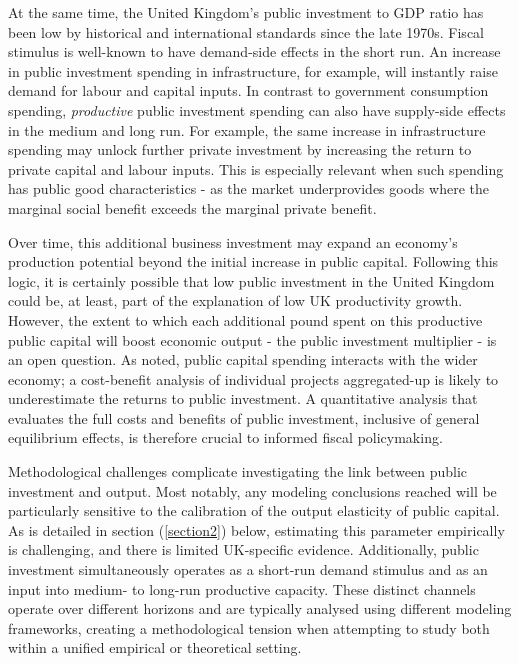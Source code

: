 \documentclass[titlepage, 11pt, a4paper]{article}
\renewcommand{\&}{and}
\begin{document}
At the same time, the United Kingdom's public investment to GDP ratio has been low by historical and international standards since the late 1970s. Fiscal stimulus is well-known to have demand-side effects in the short run. An increase in public investment spending in infrastructure, for example, will instantly raise demand for labour and capital inputs. 
In contrast to government consumption spending, \textit{productive} public investment spending can also have supply-side effects in the medium and long run. For example, the same increase in infrastructure spending may unlock further private investment by increasing the return to private capital and labour inputs. This is especially relevant when such spending has public good characteristics - as the market underprovides goods where the marginal social benefit exceeds the marginal private benefit.

Over time, this additional business investment may expand an economy's production potential beyond the initial increase in public capital. 
Following this logic, it is certainly possible that low public investment in the United Kingdom could be, at least, part of the explanation of low UK productivity growth.
However, the extent to which each additional pound spent on this productive public capital will boost economic output - the public investment multiplier - is an open question. As noted, public capital spending interacts with the wider economy; a cost-benefit analysis of individual projects aggregated-up is likely to underestimate the returns to public investment. A quantitative analysis that evaluates the full costs and benefits of public investment, inclusive of general equilibrium effects, is therefore crucial to informed fiscal policymaking. 

Methodological challenges complicate investigating the link between public investment and output. Most notably, any modeling conclusions reached will be particularly sensitive to the calibration of the output elasticity of public capital. As is detailed in section (\ref{section2}) below, estimating this parameter empirically is challenging, and there is limited  UK-specific evidence. 
Additionally, public investment simultaneously operates as a short-run demand stimulus and as an input into medium- to long-run productive capacity.  These distinct channels operate over different horizons and are typically analysed using different modeling frameworks, creating a methodological tension when attempting to study both within a unified empirical or theoretical setting.
\end{document}
